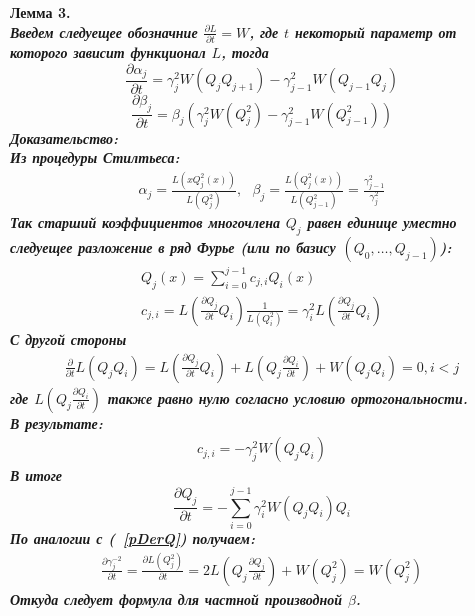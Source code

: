 \bf Лемма 3. \rm \\
\it Введем следуещее обозначние $\frac{\partial L}{\partial t}=W$, где
$t$ некоторый параметр от которого зависит функционал $L$, тогда
\begin{equation}
\frac{\partial \alpha_j} {\partial t}=\gamma_j^2W(Q_jQ_{j+1})-\gamma_{j-1}^2W(Q_{j-1}Q_j)
\end{equation}
\begin{equation}
\frac{\partial \beta_j} {\partial t}=\beta_j(\gamma_j^2W(Q_j^2)-\gamma_{j-1}^2W(Q_{j-1}^2))
\end{equation}
\rm
\bf Доказательство: \rm \\
Из процедуры Стилтьеса:
\begin{eqnarray}
\alpha_j=\frac{L(xQ_j^2(x))}{L(Q_j^2)},\mbox{   }\beta_j=\frac{L(Q_j^2(x))}{L(Q_{j-1}^2)}=\frac{\gamma_{j-1}^2}{\gamma_j^2} \nonumber
\end{eqnarray}
Так старший коэффициентов многочлена $Q_j$ равен единице
уместно следуещее разложение в ряд Фурье
(или по базису $(Q_0,\ldots,Q_{j-1})$):
\begin{eqnarray}
Q_j(x)=\sum\limits_{i=0}^{j-1}{c_{j,i}Q_i(x)} \nonumber \\
c_{j,i}=
L
\left(
\frac {\partial Q_j}  {\partial t}
Q_i
\right)
\frac{1}{L(Q_i^2)}
=
\gamma_i^2
L
\left(
\frac{\partial Q_j} {\partial t}
Q_i
\right)
\nonumber
\end{eqnarray}
С другой стороны
\begin{eqnarray}
\label{pDerQ}
\frac{\partial} {\partial t} L(Q_jQ_i)=
L\left(
\frac{\partial Q_j} {\partial t} Q_i
\right)
+L\left(
Q_j \frac{\partial Q_i} {\partial t}
\right)+
W(Q_jQ_i)=0,i<j
\end{eqnarray}
где $L\left(
Q_j \frac{\partial Q_i} {\partial t}
\right)$ также равно нулю согласно условию ортогональности. \\
В результате:
\begin{eqnarray}
c_{j,i}=-\gamma_j^2W(Q_jQ_i) \nonumber
\end{eqnarray}
В итоге
\begin{equation}
\label{DerQj}
\frac{\partial Q_j} {\partial t}=-\sum\limits_{i=0}^{j-1}{\gamma_i^2 W(Q_jQ_i)Q_i}
\end{equation}
По аналогии с (~\ref{pDerQ}) получаем:
\begin{eqnarray}
\frac{\partial \gamma_j^{-2}}{\partial t}=\frac{\partial L(Q_j^2)} {\partial t}=
2L\left(
Q_j\frac{\partial Q_j} {\partial t}\right)+W(Q_j^2)=W(Q_j^2)
\end{eqnarray}
Откуда следует формула для частной производной $\beta$.\\
